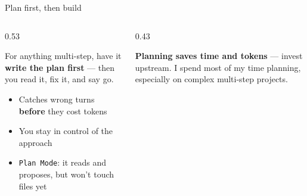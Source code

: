 \documentclass[aspectratio=169, 10pt]{beamer}
\begin{document}
\begin{frame}{Plan first, then build}
\vskip4pt
\begin{columns}[T]
\begin{column}{0.53\textwidth}
\begin{tcolorbox}[keybox, title={\faClipboardList\quad Ask for a plan before it acts}, top=3pt, bottom=3pt]
\small
For anything multi-step, have it \textbf{write the plan first} --- then you read it, fix it, and say go.
\vskip3pt
\begin{itemize}\setlength{\itemsep}{2pt}
  \item Catches wrong turns \textbf{before} they cost tokens
  \item You stay in control of the approach
  \item \texttt{Plan Mode}: it reads and proposes, but won't touch files yet
\end{itemize}
\end{tcolorbox}
\end{column}
\begin{column}{0.43\textwidth}
\begin{tcolorbox}[accentbox, top=3pt, bottom=3pt]
\small \textbf{Planning saves time and tokens} --- invest upstream.
\vskip3pt
I spend most of my time planning, especially on complex multi-step projects.
\end{tcolorbox}
\end{column}
\end{columns}
\end{frame}
\end{document}
